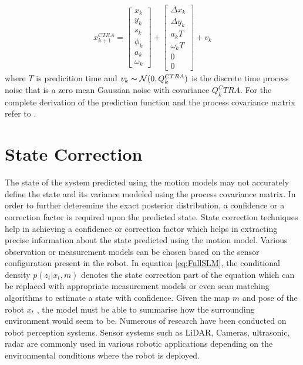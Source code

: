 \begin{gather} \label{CTRA_pred_ct}
    x_{k+1}^{CTRA}
    =
    \begin{bmatrix} 
        x_k \\ y_k \\ s_k \\ \phi_k \\ a_k\\ \omega_k
    \end{bmatrix}
    +
    \begin{bmatrix} 
        \Delta x_k \\ \Delta y_k \\ a_k T \\ \omega_k T \\ 0 \\ 0
    \end{bmatrix}
    + v_k
\end{gather}
where $T$ is predicition time and $v_k \thicksim  \mathcal{N}(0,Q_{k}^{CTRA})$ is the discrete time process noise that is a zero mean Gaussian noise with covariance $Q_k^CTRA$. For the complete derivation of the prediction function and the 
process covariance matrix refer to \cite{D.Svensson}.

\section{State Correction}
    The state of the system predicted using the motion models may not accurately define the state and its variance modeled using the process covariance matrix. In order to further deteremine 
the exact posterior distribution, a confidence or a correction factor is required upon the predicted state. State correction techniques help in achieving a confidence or correction factor which
helps in extracting precise information about the state predicted using the motion model. Various observation or measurement models can be chosen based on the sensor configuration present in the robot.
In equation \ref{eq:FullSLM}, the conditional density $p(z_t | x_t, m)$ denotes the state correction part of the equation which can be replaced with appropriate measurement models or even scan matching algorithms 
to estimate a state with confidence. Given the map $m$ and pose of the robot $x_t$ , the model must be able to summarise how the surrounding environment would seem to be. Numerous of research have been conducted
on robot perception systems. Sensor systems such as LiDAR, Cameras, ultrasonic, radar are commonly used in various robotic applications depending on the environmental conditions where the robot is deployed.

